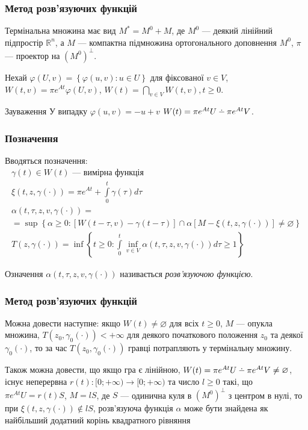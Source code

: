 \documentclass[10pt,pdf,aspectratio=169]{beamer}
\newcommand{\R}{\mathbb{R}}
\newcommand{\vf}{\varphi}
\renewcommand{\l}{\left}
\renewcommand{\r}{\right}
\newcommand{\intl}{\int\limits}
\def\setdif{\mathbin{\ooalign{\hss\raise1ex\hbox{.}\hss\cr
  \mathsurround=0pt$-$}}}
\begin{document}
    \begin{frame}
        \frametitle{Метод розв’язуючих функцій}
    
        Термінальна множина має вид $M^* = M^0 + M$, де
        $M^0$ --- деякий лінійний підпростір $\R^n$, а $M$ --- компактна підмножина ортогонального доповнення $M^0$,
        $\pi$ --- проектор на $(M^0)^\perp$.

        Нехай $\vf(U, v) = \l\{\vf(u,v) : u \in U\r\}$ для фіксованої $v \in V$,
        $W(t, v) = \pi e^{At} \vf(U, v)$,
        $W(t) = \bigcap\limits_{v \in V} W(t, v), t\geq 0$. 
        \begin{block}{Зауваження}
            У випадку $\vf(u,v) = -u + v$ $W(t) = \pi e^{At}U \setdif \pi e^{At} V$.
        \end{block}
    
    \end{frame}
    \begin{frame}
        \frametitle{Позначення}
    
        Вводяться позначення:
        \begin{gather*}
            \gamma(t) \in W(t) \text{ --- вимірна функція} \\
            \xi(t, z, \gamma(\cdot)) = \pi e^{A t} + \intl_0^t \gamma(\tau) d\tau \\
            \alpha(t, \tau, z, v, \gamma(\cdot)) = \\ = \sup\l\{ 
                \alpha \geq 0 : \l[ W(t-\tau, v) - \gamma(t-\tau)\r] \cap \alpha
                \l[M - \xi(t, z, \gamma(\cdot))\r] \neq \varnothing
            \r\} \\
            T(z, \gamma(\cdot)) = \inf \l\{ 
                t\geq 0: \intl_0^t \underset{v\in V}{\inf} \alpha(t, \tau, z, v, \gamma(\cdot)) d\tau \geq 1
            \r\}
        \end{gather*}

        \begin{block}{Означення}
            $\alpha(t, \tau, z, v, \gamma(\cdot))$ називається \emph{розв'язуючою функцією}.
        \end{block}
    \end{frame}
    \begin{frame}
        \frametitle{Метод розв’язуючих функцій}
    
        Можна довести наступне: якщо $W(t) \neq \varnothing$ для всіх $t\geq 0$,
        $M$ --- опукла множина, $T(z_0, \gamma_0(\cdot)) < +\infty$ для деякого початкового положення
        $z_0$ та деякої $\gamma_0(\cdot)$, то за час $T(z_0, \gamma_0(\cdot))$ гравці потрапляють у термінальну множину.

        Також можна довести, що якщо гра є лінійною,
        $W(t) = \pi e^{At}U \setdif \pi e^{At} V \neq \varnothing$, існує неперервна 
        $r(t): [0; +\infty) \to [0; +\infty)$ та число $l \geq 0$ такі, що
        $\pi e^{A t}U = r(t) S$, $M = l S$, де $S$ --- одинична куля в $(M^0)^\perp$ з центром в нулі, то
        при $\xi(t, z, \gamma(\cdot)) \notin l S$, розв'язуюча функція $\alpha$ може бути знайдена як найбільший додатний корінь квадратного рівняння
    
    \end{frame}
\end{document}
